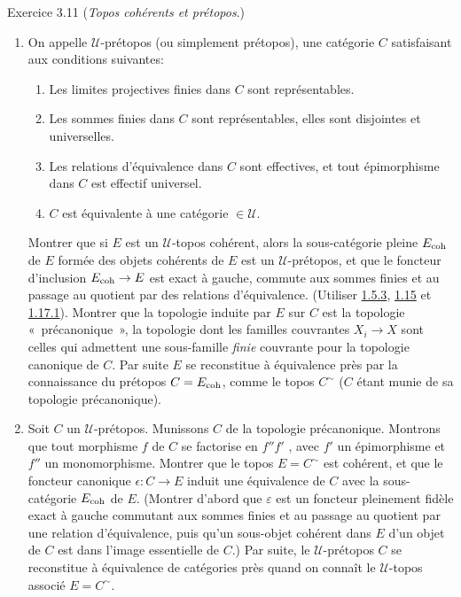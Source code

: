 \documentclass[10pt]{../fichiers-configuration-latex/smfart}
\begin{document}
\begin{enonce*}[remark]{Exercice 3.11}
(\emph{Topos cohérents et prétopos}.)
\begin{enumerate}
\renewcommand{\theenumi}{\alph {enumi}}
\renewcommand{\labelenumi}{\theenumi)}
\item On appelle $𝒰$-prétopos (ou simplement prétopos), une catégorie
  $C$ satisfaisant aux conditions suivantes:
\begin{enumerate}
\renewcommand{\theenumii}{\arabic{enumii}}
\renewcommand{\labelenumii}{\theenumii)}
\item Les limites projectives finies dans $C$ sont représentables.

\item Les sommes finies dans $C$ sont représentables, elles sont
  disjointes et universelles.

\item Les relations d'équivalence dans $C$ sont effectives, et tout
  épimorphisme dans $C$ est effectif universel.

\item $C$ est équivalente à une catégorie $\in 𝒰$.
\end{enumerate}
Montrer que si $E$ est un $𝒰$-topos cohérent, alors la
sous-catégorie pleine $E_{\mathrm{coh}}$ de $E$ formée des objets cohérents
de $E$ est un $𝒰$-prétopos, et que le foncteur d'inclusion
$E_{\coh} \to E$ est exact à gauche, commute aux\pageoriginale
sommes finies et au passage au quotient par des relations
d'équivalence. (Utiliser \hyperref[VI.subsubsec1.5.3]{1.5.3}, \hyperref[VI.cor1.15]{1.15}
et \hyperref[VI.cor1.17.1]{1.17.1}). Montrer que la topologie induite par $E$ sur
$C$ est la topologie « précanonique », \ie la topologie dont les
familles couvrantes $X_i \to X$ sont celles qui admettent une
sous-famille \emph{finie} couvrante pour la topologie canonique de
$C$. Par suite $E$ se reconstitue à équivalence près par la
connaissance du prétopos $C = E_{\mathrm{coh}}$, comme le topos $C^{\sim}$
($C$ étant munie de sa topologie précanonique).

\item Soit $C$ un $𝒰$-prétopos. Munissons $C$ de la topologie
  précanonique. Montrons que tout morphisme $f$ de $C$ se factorise en
  $f'' f'$ , avec $f'$ un épimorphisme et $f''$ un
  monomorphisme. Montrer que le topos $E = C^{\sim}$ est cohérent, et
  que le foncteur canonique $\epsilon : C \to E$ induit une
  équivalence de $C$ avec la sous-catégorie $E_{\mathrm{coh}}$ de $E$. (Montrer
  d'abord que $\varepsilon$ est un foncteur pleinement fidèle exact à
  gauche commutant aux sommes finies et au passage au quotient par une
  relation d'équivalence, puis qu'un sous-objet cohérent dans $E$ d'un
  objet de $C$ est dans l'image essentielle de $C$.) Par suite, le
  $𝒰$-prétopos $C$ se reconstitue à équivalence de catégories près
  quand on connaît le $𝒰$-topos associé $E = C^{\sim}$.


\end{enumerate}
\end{enonce*}
\end{document}
